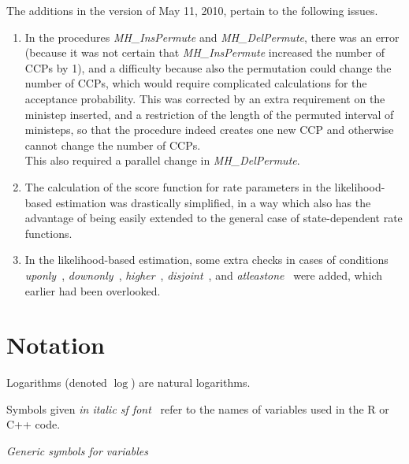 \documentclass[a4paper,12pt,fleqn]{article}
\newcommand{\nnm}[1]{\textsf{\small\textit{#1}\ }}
\newcommand{\R}{{\sf R }}
\newcommand{\adda}[1]{{#1}}  %
\begin{document}
The additions in the version of May 11, 2010, pertain to the
following issues.
\begin{enumerate}
\item In the procedures \textit{MH\_InsPermute} and \textit{MH\_DelPermute},
      there was an error (because it was not certain that  \textit{MH\_InsPermute}
      increased the number of CCPs by 1),
      and a difficulty because also the permutation could
      change the number of CCPs, which would require complicated calculations
      for the acceptance probability. This was corrected by an extra
      requirement on the ministep inserted, and a restriction of the length
      of the permuted interval of ministeps, so that the procedure indeed
      creates one new CCP and otherwise cannot change the number of CCPs.\\
      This also required a parallel change  in \textit{MH\_DelPermute}.
\item The calculation of the score function for rate parameters in the
      likelihood-based estimation was drastically simplified,
      in a way which also has the advantage of being easily extended
      to the general case of state-dependent rate functions.
\item In the likelihood-based estimation, some extra checks in cases
      of conditions \nnm{uponly}, \nnm{downonly}, \nnm{higher},
      \nnm{disjoint}, and \nnm{atleastone} were added,
      which earlier had been overlooked.
\end{enumerate}
\fi

\section{Notation}

\adda{Logarithms (denoted $\log$) are natural logarithms.}

Symbols given \nnm{in italic sf font} refer to the names
of variables used in the \R or C++ code.

\emph{Generic symbols for variables}
\end{document}
